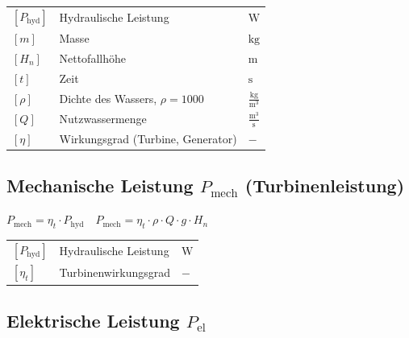 \renewcommand{\arraystretch}{1.2}
\begin{tabular}{@{} l p{6cm} l @{}}
    $[P_{\text{hyd}}]$  & Hydraulische Leistung \dotfill                & $\text{W}$ \\
    $[m]$               & Masse \dotfill                                & $\text{kg}$ \\
    $[H_n]$             & Nettofallhöhe \dotfill                        & $\text{m}$ \\
    $[t]$               & Zeit \dotfill                                & $\text{s}$ \\
    $[\rho]$            & Dichte des Wassers, $\rho = 1000$ \dotfill    & $\frac{\text{kg}}{\text{m}^3}$ \\
    $[Q]$               & Nutzwassermenge \dotfill                      & $\frac{\text{m}^3}{\text{s}}$\\ 
    $[\eta]$            & Wirkungsgrad (Turbine, Generator) \dotfill & $-$ \\
\end{tabular}

\subsection[\texorpdfstring{Mechanische Leistung $P_{\text{mech}}$ (Turbinenleistung)}{Mechanische Leistung Pmech (Turbinenleistung)}]
{Mechanische Leistung $P_{\text{mech}}$ (Turbinenleistung)}

$
\boxed{P_{\text{mech}} = \eta_t \cdot P_{\text{hyd}}} 
\quad 
\boxed{P_{\text{mech}} = \eta_t \cdot \rho \cdot Q \cdot g \cdot H_n}
$

\vspace{0.15cm}

\renewcommand{\arraystretch}{1.2}
\begin{tabular}{@{} l p{7cm} l @{}}
    $[P_{\text{hyd}}]$   & Hydraulische Leistung \dotfill                               & $\text{W}$ \\
    $[\eta_t]$           & Turbinenwirkungsgrad \dotfill                               & $-$ \\
\end{tabular}



\subsection[\texorpdfstring{Elektrische Leistung $P_{\text{el}}$}{Elektrische Leistung Pel}]
            {Elektrische Leistung $P_{\text{el}}$}

